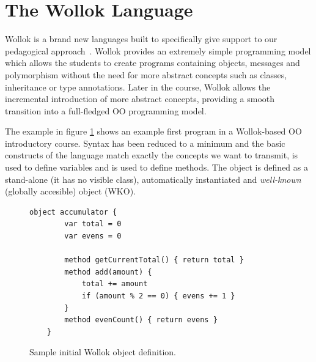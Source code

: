 \section{The Wollok Language}
\label{sec:wollokLanguage}


Wollok is a brand new languages built to specifically give support to our pedagogical approach~\cite{lombardi_instances_2007,lombardi_carlos_alumnos_2008}. 
Wollok provides an extremely simple programming model which allows the students to create programs containing objects, messages and polymorphism without the need for more abstract concepts such as classes, inheritance or type annotations.
Later in the course, Wollok allows the incremental introduction of more abstract concepts,
providing a smooth transition into a full-fledged OO programming model.

The example in figure \ref{fig:helloWorld/wollok} shows an example first program in a Wollok-based OO introductory course.
Syntax has been reduced to a minimum and the basic constructs of the language match exactly the concepts we want to transmit, \eg {} is used to define variables and  is used to define methods.
The  object is defined as a stand-alone (\ie it has no visible class), automatically instantiated and \emph{well-known} (\ie globally accesible) object (WKO).

\vspace{-3mm}
\begin{figure}[ht]
 \centering
 \begin{lstlisting}[language=Wollok]
	object accumulator {
		var total = 0
		var evens = 0
		
		method getCurrentTotal() { return total }
		method add(amount) { 
			total += amount 
			if (amount % 2 == 0) { evens += 1 }
		}
		method evenCount() { return evens }
	}\end{lstlisting}
\vspace{-3mm}
\caption{\small Sample initial Wollok object definition.}
\label{fig:helloWorld/wollok}
\end{figure}


